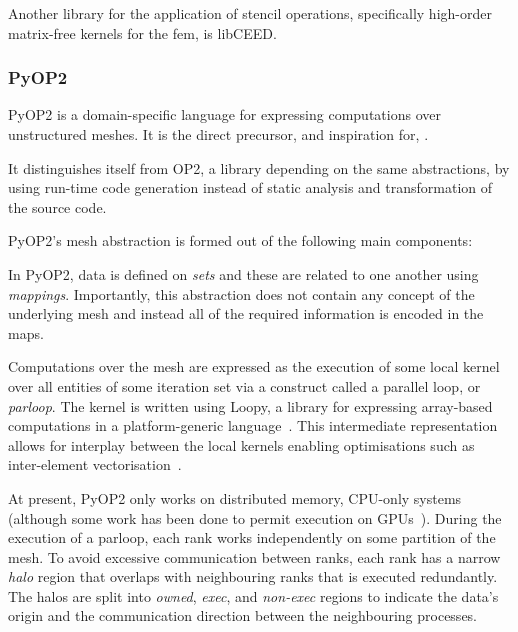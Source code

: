 
Another library for the application of stencil operations, specifically high-order matrix-free kernels for the \gls{fem}, is libCEED.

\subsubsection{PyOP2}

PyOP2 is a domain-specific language for expressing computations over unstructured meshes.
It is the direct precursor, and inspiration for, .

It distinguishes itself from OP2, a library depending on the same abstractions, by using run-time code generation instead of static analysis and transformation of the source code.

PyOP2's mesh abstraction is formed out of the following main components:


In PyOP2, data is defined on \textit{sets} and these are related to one another using \textit{mappings}.
Importantly, this abstraction does not contain any concept of the underlying mesh and instead all of the required information is encoded in the maps.

  Computations over the mesh are expressed as the execution of some local kernel over all entities of some iteration set via a construct called a parallel loop, or \textit{parloop}.
  The kernel is written using Loopy, a library for expressing array-based computations in a platform-generic language~\cite{klocknerLooPyTransformationbased2014}.
  This intermediate representation allows for interplay between the local kernels enabling optimisations such as inter-element vectorisation~\cite{sunStudyVectorizationMatrixfree2020}.

  At present, PyOP2 only works on distributed memory, CPU-only systems (although some work has been done to permit execution on GPUs~\cite{fenics2021-kulkarni}).
  During the execution of a parloop, each rank works independently on some partition of the mesh.
  To avoid excessive communication between ranks, each rank has a narrow \textit{halo} region that overlaps with neighbouring ranks that is executed redundantly.
  The halos are split into \textit{owned}, \textit{exec}, and \textit{non-exec} regions to indicate the data's origin and the communication direction between the neighbouring processes.


